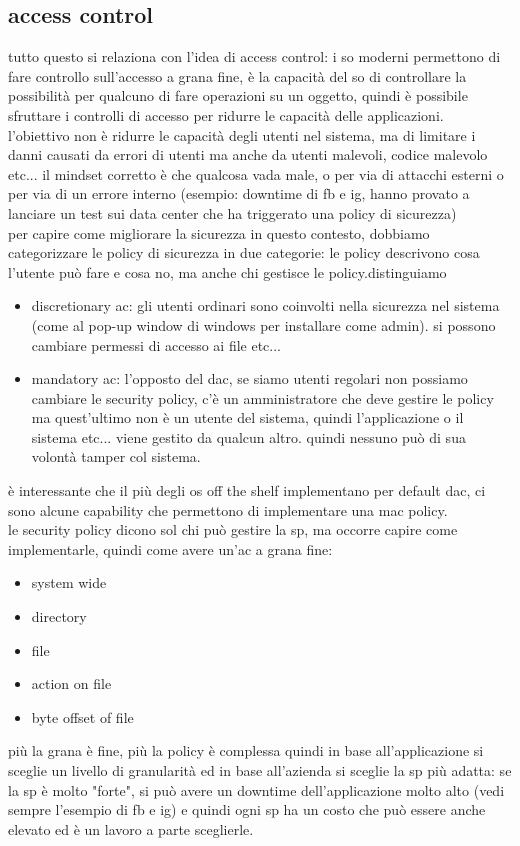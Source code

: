 \documentclass[12pt, oneside]{extbook} %
\begin{document}
\subsection{access control}
tutto questo si relaziona con l'idea di access control: i so moderni permettono di fare controllo sull'accesso a grana fine, è la capacità del so di controllare la possibilità per qualcuno di fare operazioni su un oggetto, quindi è possibile sfruttare i controlli di accesso per ridurre le capacità delle applicazioni.\\l'obiettivo non è ridurre le capacità degli utenti nel sistema, ma di limitare i danni causati da errori di utenti ma anche da utenti malevoli, codice malevolo etc... il mindset corretto è che qualcosa vada male, o per via di attacchi esterni o per via di un errore interno (esempio: downtime di fb e ig, hanno provato a lanciare un test sui data center che ha triggerato una policy di sicurezza)\\per capire come migliorare la sicurezza in questo contesto, dobbiamo categorizzare le policy di sicurezza in due categorie: le policy descrivono cosa l'utente può fare e cosa no, ma anche chi gestisce le policy.distinguiamo
\begin{itemize}
\item discretionary ac: gli utenti ordinari sono coinvolti nella sicurezza nel sistema (come al pop-up window di windows per installare come admin). si possono cambiare permessi di accesso ai file etc...
\item mandatory ac: l'opposto del dac, se siamo utenti regolari non possiamo cambiare le security policy, c'è un amministratore che deve gestire le policy ma quest'ultimo non è un utente del sistema, quindi l'applicazione o il sistema etc... viene gestito da qualcun altro. quindi nessuno può di sua volontà tamper col sistema.
\end{itemize}
è interessante che il più degli os off the shelf implementano per default dac, ci sono alcune capability che permettono di implementare una mac policy.\\le security policy dicono sol chi può gestire la sp, ma occorre capire come implementarle, quindi come avere un'ac a grana fine:
\begin{itemize}
\item system wide
\item directory
\item file
\item action on file
\item byte offset of file
\end{itemize}
più la grana è fine, più la policy è complessa quindi in base all'applicazione si sceglie un livello di granularità ed in base all'azienda si sceglie la sp più adatta: se la sp è molto "forte", si può avere un downtime dell'applicazione molto alto (vedi sempre l'esempio di fb e ig) e quindi ogni sp ha un costo che può essere anche elevato ed è un lavoro a parte sceglierle.
\end{document}
